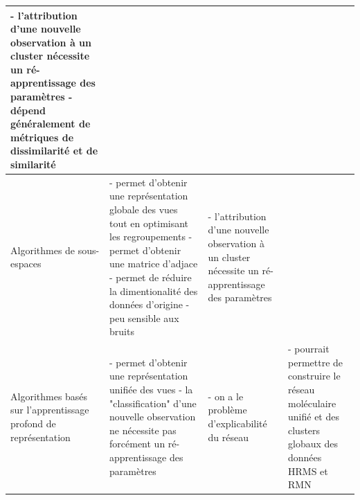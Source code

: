 \documentclass[12pt, french, latin.medieval, a4paper]{report}
\begin{document}
\begin{center}
\begin{longtable}{|p{2.5cm}|p{4.5cm}|p{4.5cm}|p{3cm}|}
                    	{- l'attribution d'une nouvelle observation à un cluster nécessite un ré-apprentissage des paramètres} \newline\newline
                    	{- dépend généralement de métriques de dissimilarité et de similarité}
                    	\\
                    	\hline
                    	Algorithmes de sous-espaces
                    	&
                    	{- permet d'obtenir une représentation globale des vues tout en optimisant les regroupements } \newline\newline
                        {- permet d'obtenir une matrice d'adjace } \newline\newline
                        {- permet de réduire la dimentionalité des données d'origine } \newline\newline
                    	{- peu sensible aux bruits}
                    	&
                    	{- l'attribution d'une nouvelle observation à un cluster nécessite un ré-apprentissage des paramètres}
                    	\\
                    	\hline
                    	Algorithmes basés sur l'apprentissage profond de représentation
                    	&
                    	{- permet d'obtenir une représentation unifiée des vues } \newline\newline
                    	{- la "classification" d'une nouvelle observation ne nécessite pas forcément un ré-apprentissage des paramètres}
                    	&
                    	{- on a le problème d'explicabilité du réseau}
                    	&
                    	{- pourrait permettre de construire le réseau moléculaire unifié et des clusters globaux des données HRMS et RMN}
                    	\\
                	\hline
            	\end{longtable}
        	\end{center}
\end{document}

